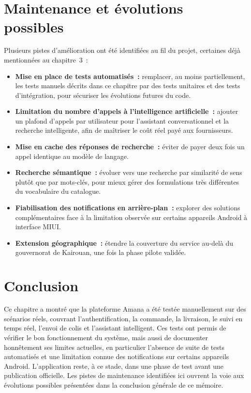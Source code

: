\documentclass[12pt,fleqn,a4paper]{report}
\begin{document}
\begin{justify}
\section{Maintenance et évolutions possibles}

Plusieurs pistes d'amélioration ont été identifiées au fil du projet, certaines déjà mentionnées au chapitre~3~:

\begin{itemize}
    \item \textbf{Mise en place de tests automatisés~:} remplacer, au moins partiellement, les tests manuels décrits dans ce chapitre par des tests unitaires et des tests d'intégration, pour sécuriser les évolutions futures du code.
    \item \textbf{Limitation du nombre d'appels à l'intelligence artificielle~:} ajouter un plafond d'appels par utilisateur pour l'assistant conversationnel et la recherche intelligente, afin de maîtriser le coût réel payé aux fournisseurs.
    \item \textbf{Mise en cache des réponses de recherche~:} éviter de payer deux fois un appel identique au modèle de langage.
    \item \textbf{Recherche sémantique~:} évoluer vers une recherche par similarité de sens plutôt que par mots-clés, pour mieux gérer des formulations très différentes du vocabulaire du catalogue.
    \item \textbf{Fiabilisation des notifications en arrière-plan~:} explorer des solutions complémentaires face à la limitation observée sur certains appareils Android à interface MIUI.
    \item \textbf{Extension géographique~:} étendre la couverture du service au-delà du gouvernorat de Kairouan, une fois la phase pilote validée.
\end{itemize}

\section{Conclusion}

Ce chapitre a montré que la plateforme Amana a été testée manuellement sur des scénarios réels, couvrant l'authentification, la commande, la livraison, le suivi en temps réel, l'envoi de colis et l'assistant intelligent. Ces tests ont permis de vérifier le bon fonctionnement du système, mais aussi de documenter honnêtement ses limites actuelles, en particulier l'absence de suite de tests automatisés et une limitation connue des notifications sur certains appareils Android. L'application reste, à ce stade, dans une phase de test avant une publication officielle. Les pistes de maintenance identifiées ici ouvrent la voie aux évolutions possibles présentées dans la conclusion générale de ce mémoire.


\end{justify}
\end{document}

